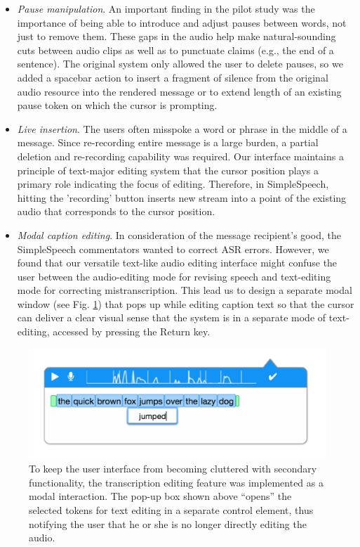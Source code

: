\begin{itemize}
	\item \emph{Pause manipulation}. An important finding in the pilot study was the importance of being able to introduce and adjust pauses between words, not just to remove them.
	These gaps in the audio help make natural-sounding cuts between audio clips as well as to punctuate claims (e.g., the end of a sentence). 
	The original system only allowed the user to delete pauses, so we added a spacebar action to insert a fragment of silence from the original audio resource into the rendered message or to extend length of an existing pause token on which the cursor is prompting.
	\item \emph{Live insertion}. The users often misspoke a word or phrase in the middle of a message.
	Since re-recording entire message is a large burden, a partial deletion and re-recording capability was required.
	Our interface maintains a principle of text-major editing system that the cursor position plays a primary role indicating the focus of editing.
	Therefore, in SimpleSpeech, hitting the 'recording' button inserts new  stream into a point of the existing audio that corresponds to the cursor position.
	\item \emph{Modal caption editing}. In consideration of the message recipient's good, the SimpleSpeech commentators wanted to correct ASR errors.
	However, we found that our versatile text-like audio editing interface might confuse the user between the audio-editing mode for revising speech and text-editing mode for correcting mistranscription.
	This lead us to design a separate modal window (see Fig. \ref{fig:transcription}) that pops up while editing caption text so that the cursor can deliver a clear visual sense that the system is in a separate mode of text-editing, accessed by pressing the Return key.
\end{itemize}



\begin{figure}
	\centering
	\includegraphics[width=\columnwidth,keepaspectratio]{figures/transcription_edit}
	\caption{To keep the user interface from becoming cluttered with secondary functionality, the transcription editing feature was implemented as a modal interaction. The pop-up box shown above ``opens'' the selected tokens for text editing in a separate control element, thus notifying the user that he or she is no longer directly editing the audio.}
	\label{fig:transcription}
\end{figure}


